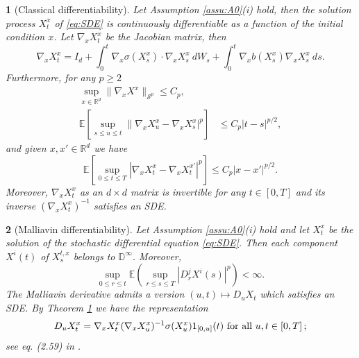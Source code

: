 \documentclass[12,english]{amsart}
\theoremstyle{plain}
\newtheorem{thm}{\protect\theoremname}
\theoremstyle{definition}
\theoremstyle{plain}
\theoremstyle{plain}
\theoremstyle{remark}
\providecommand{\theoremname}{Theorem}
\newcommand{\E}{\mathbb E}
\newcommand{\D}{\mathbb D}
\newcommand{\R}{\mathbb R}
\newcommand{\cS}{\mathcal S}
\newcommand{\si}{\sigma}
\begin{document}
\begin{thm}
  [Classical differentiability]\label{thm:c_diff}
 Let Assumption \ref{assu:A0}(i) hold, then the solution process
 $X_t^x$  of \eqref{eq:SDE}  is continuously differentiable
as a function of the initial condition $x$.
Let $\nabla_xX_t^x$ be the Jacobian matrix, %
then
\[
\nabla_xX_t^x=I_d+\int_0^t\nabla_x\si(X_s^x)\cdot\nabla_xX_s^x\
dW_s+\int_0^t\nabla_xb(X_s^x)\nabla_xX_s^x\ ds.
\]
Furthermore, for any $p\ge 2$
\begin{align}\label{eq:D1.2.6}
\sup_{x\in\R^d}\|\nabla_xX^x\| _{\cS^p} \leq C_p,\\
\E[\sup_{s\le u\le t}\|\nabla_xX_u^x-\nabla_xX_s^x|^{p}] & \leq C_p|t-s|^{p/2},\label{eq:D1.2.7}
\end{align}
and given $x,x'\in\R^d$ we have
\begin{equation}
  \E[\sup_{0\leq t\leq T}|\nabla_xX_t^x-\nabla_xX_t^{x'}|^{p}]\leq C_{p}|x-x'|^{p/2}.\label{eq:D_1.2.7}
\end{equation}
Moreover, $\nabla_xX_t^x$ as an $d\times d$
matrix is invertible for any $t\in\left[0,T\right]$ and its inverse
$(\nabla_xX_t^x)^{-1}$ satisfies an SDE.
\end{thm}

\begin{thm}
  [Malliavin differentiability]\label{thm:Malliavin}
  Let Assumption \ref{assu:A0}(i) hold and let $X^x_t$ be the solution of the stochastic
    differential equation \eqref{eq:SDE}. Then each component $X^i(t)$
  of $X^{t,x}_s$ belongs to $\D^{\infty}$.
  Moreover, 
\begin{equation}
\underset{0\leq r\leq t}{\sup}\mathbb{E}\left(\underset{r\leq s\leq T}{\sup}\left|D_{r}^{j}X^{i}\left(s\right)\right|^{p}\right)<\infty.\label{eq:M_der_bound}
\end{equation}
The Malliavin derivative admits a version $(u,t) \mapsto D_uX_t$ which satisfies an SDE. By Theorem \ref{thm:c_diff} we have the representation
\begin{equation}
D_{u}X^x_{t}=\nabla_{x}X^x_{t}(\nabla_{x}X^x_{u})^{-1}\sigma(X^x_{u})1_{\left[0,u\right]}(t)\hbox{ for all }u,t\in\left[0,T\right];\label{eq:rep1.2.10}
\end{equation}
see eq. (2.59) in \cite{nualart2006malliavin}.
\end{thm}
\end{document}
